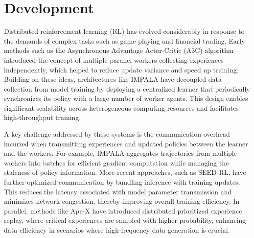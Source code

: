 
%
%
%
%
%


\chapter{Development}
\label{ch:development}

Distributed reinforcement learning (RL) has evolved considerably in response to the demands of complex tasks such as game playing and financial trading.
Early methods such as the Asynchronous Advantage Actor-Critic (A3C)
algorithm introduced the concept of multiple parallel workers collecting experiences independently,
which helped to reduce update variance and speed up training.
Building on these ideas, architectures like IMPALA have decoupled data collection from model training by deploying a
centralized learner that periodically synchronizes its policy with a large number of worker agents.
This design enables significant scalability across heterogeneous computing resources and facilitates high-throughput training.

A key challenge addressed by these systems is the communication overhead incurred when transmitting experiences and
updated policies between the learner and the workers.
For example, IMPALA aggregates trajectories from multiple workers into
batches for efficient gradient computation while managing the staleness of policy information.
More recent approaches, such as SEED RL, have further optimized communication by bundling inference with training updates.
This reduces the latency associated with model parameter transmission and minimizes network congestion, thereby improving overall training efficiency.
In parallel, methods like Ape-X have introduced distributed prioritized experience replay, where critical experiences are sampled with higher probability,
enhancing data efficiency in scenarios where high-frequency data generation is crucial.

